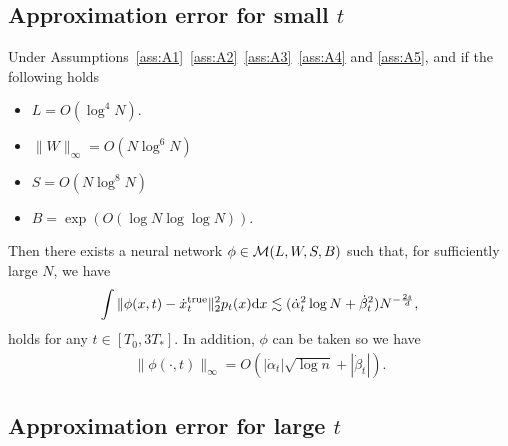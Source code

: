 \subsection{Approximation error for small \texorpdfstring{$t$}{}}
\begin{lemma}\label{lem:error_approx_small_t}
    Under Assumptions~\ref{ass:A1}~\ref{ass:A2}~\ref{ass:A3}~\ref{ass:A4} and \ref{ass:A5}, and if the following holds 
    \begin{itemize}
        \item $L = O(\log^4 N )$.
        \item $\|W\|_{\infty} = O(N \log^{6} N)$
        \item $S = O(N \log^{8} N)$
        \item $B = \exp(O (\log N \log \log N ) ).$
    \end{itemize}
    Then there exists a neural network $\phi  \in  {\cal M}(L,W,S,B)$ such that, for sufficiently large $N$, we have
    \begin{align*}
        \int  \|\phi(x,t) - \dot{x}_t^\mathrm{true} \|^{2}_2 p_{t}(x) \mathrm{d} x \lesssim  (\dot{\alpha}_t^{2} \log N  +  \dot{\beta}_t^{2} ) N^{-\frac{2s}{d}},
    \end{align*}
    holds for any $t \in [T_{0}, 3T_{*}]$.
    In addition, $\phi$ can be taken so we have
    \begin{align*}
         \|\phi(\cdot,t) \|_\infty = O(  |\dot{\alpha}_t | \sqrt{\log n} +  |\dot{\beta}_t |) .
    \end{align*}
\end{lemma}

\subsection{Approximation error for large \texorpdfstring{$t$}{}}

